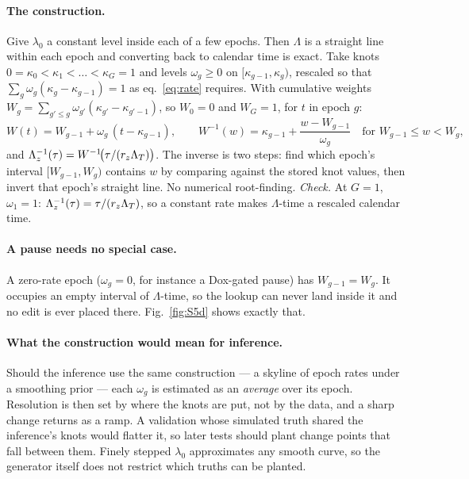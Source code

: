 \paragraph{The construction.} Give $\lambda_0$ a constant level inside each of a few epochs. Then
$\Lambda$ is a straight line within each epoch and converting back to calendar time is exact.
Take knots $0=\kappa_0<\kappa_1<\dots<\kappa_G=1$ and levels $\omega_g\ge0$ on
$[\kappa_{g-1},\kappa_g)$, rescaled so that $\sum_g\omega_g(\kappa_g-\kappa_{g-1})=1$ as
eq.~\eqref{eq:rate} requires. With cumulative weights
$W_g=\sum_{g'\le g}\omega_{g'}(\kappa_{g'}-\kappa_{g'-1})$, so $W_0=0$ and $W_G=1$, for $t$ in epoch
$g$:
\begin{equation}
  W(t)=W_{g-1}+\omega_g\,(t-\kappa_{g-1}),
  \qquad
  W^{-1}(w)=\kappa_{g-1}+\frac{w-W_{g-1}}{\omega_g}
  \quad\text{for } W_{g-1}\le w<W_g ,
  \label{eq:Winv}
\end{equation}
and $\Lambda_z^{-1}(\tau)=W^{-1}\!\big(\tau/(r_z\Lambda_T)\big)$. The inverse is two steps: find which
epoch's interval $[W_{g-1},W_g)$ contains $w$ by comparing against the stored knot values, then invert
that epoch's straight line. No numerical root-finding.
\emph{Check.} At $G=1$, $\omega_1=1$: $\Lambda_z^{-1}(\tau)=\tau/(r_z\Lambda_T)$, so a constant rate makes
$\Lambda$-time a rescaled calendar time.

\paragraph{A pause needs no special case.} A zero-rate epoch ($\omega_g=0$, for instance a Dox-gated
pause) has $W_{g-1}=W_g$. It occupies an empty interval of $\Lambda$-time, so the lookup can never
land inside it and no edit is ever placed there. Fig.~\ref{fig:S5d} shows exactly that.

\paragraph{What the construction would mean for inference.} Should the inference use the same
construction --- a skyline of epoch rates under a smoothing prior --- each $\omega_g$ is estimated as
an \emph{average} over its epoch. Resolution is then set by where the knots are put, not by the data,
and a sharp change returns as a ramp. A validation whose simulated truth shared the inference's knots
would flatter it, so later tests should plant change points that fall between them. Finely stepped
$\lambda_0$ approximates any smooth curve, so the generator itself does not restrict which truths can
be planted.

